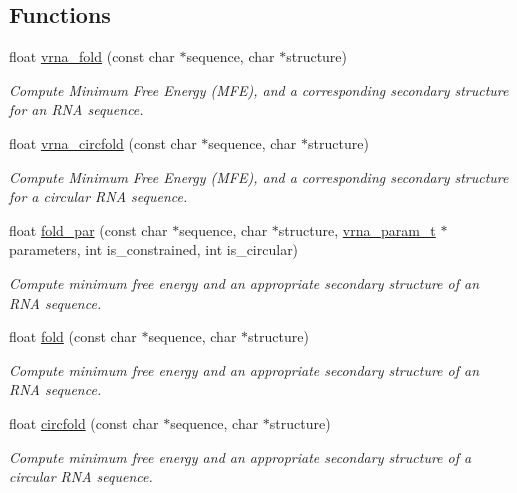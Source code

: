 \subsection*{Functions}
\begin{DoxyCompactItemize}
\item 
float \hyperlink{group__mfe__fold__single_ga29a33b2895f4e67b0480271ff289afdc}{vrna\+\_\+fold} (const char $\ast$sequence, char $\ast$structure)
\begin{DoxyCompactList}\small\item\em Compute Minimum Free Energy (M\+FE), and a corresponding secondary structure for an R\+NA sequence. \end{DoxyCompactList}\item 
float \hyperlink{group__mfe__fold__single_gaf973483d8acbc8cc9aacfc8a9b7f0074}{vrna\+\_\+circfold} (const char $\ast$sequence, char $\ast$structure)
\begin{DoxyCompactList}\small\item\em Compute Minimum Free Energy (M\+FE), and a corresponding secondary structure for a circular R\+NA sequence. \end{DoxyCompactList}\item 
float \hyperlink{group__mfe__fold__single_ga2bc41df5d71fee6fd8da9904ee65d8fb}{fold\+\_\+par} (const char $\ast$sequence, char $\ast$structure, \hyperlink{group__energy__parameters_ga8a69ca7d787e4fd6079914f5343a1f35}{vrna\+\_\+param\+\_\+t} $\ast$parameters, int is\+\_\+constrained, int is\+\_\+circular)
\begin{DoxyCompactList}\small\item\em Compute minimum free energy and an appropriate secondary structure of an R\+NA sequence. \end{DoxyCompactList}\item 
float \hyperlink{group__mfe__fold__single_gaadafcb0f140795ae62e5ca027e335a9b}{fold} (const char $\ast$sequence, char $\ast$structure)
\begin{DoxyCompactList}\small\item\em Compute minimum free energy and an appropriate secondary structure of an R\+NA sequence. \end{DoxyCompactList}\item 
float \hyperlink{group__mfe__fold__single_ga4ac63ab3e8d9a80ced28b8052d94e423}{circfold} (const char $\ast$sequence, char $\ast$structure)
\begin{DoxyCompactList}\small\item\em Compute minimum free energy and an appropriate secondary structure of a circular R\+NA sequence. \end{DoxyCompactList}\item 

\end{DoxyCompactItemize}

